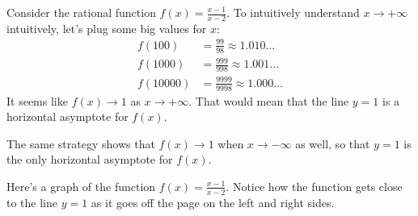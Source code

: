 \documentclass{ximera}
\begin{document}
\begin{example} 

Consider the rational function $f(x) = \frac{x-1}{x-2}$. To intuitively understand $x\to +\infty$ intuitively, let's plug some big values for $x$:
    \begin{align*}
      f(100) &= \frac{99}{98} \approx 1.010... \\ f(1000) &= \frac{999}{998} \approx 1.001... \\ f(10000) &= \frac{9999}{9998} \approx 1.000...
    \end{align*}
It seems like $f(x) \to 1$ as $x \to +\infty$.  That would mean that the line $y=1$ is a horizontal asymptote for $f(x)$. 

The same strategy shows that $f(x) \to 1$ when $x \to -\infty$ as well, so that $y=1$ is the only horizontal asymptote for $f(x)$. %

Here's a graph of the function $f(x) = \frac{x-1}{x-2}$.  Notice how the function gets close to the line $y=1$ as it goes off the page on the left and right sides.

\begin{image}
\end{image}

\end{example}
\end{document}
